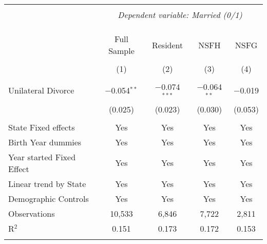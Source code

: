 
\begingroup 
\footnotesize 
\begin{tabular}{@{\extracolsep{5pt}}lcccc} 
\\[-1.8ex]\hline 
\hline \\[-1.8ex] 
 & \multicolumn{4}{c}{\textit{Dependent variable: Married (0/1)}} \\ 
\cline{2-5} 
\\[-1.8ex] &  &  &  & \\[-4.8ex] \\ 
 & Full Sample & Resident & NSFH & NSFG \\ 
\\[-1.8ex] & (1) & (2) & (3) & (4)\\ 
\hline \\[-1.8ex] 
 Unilateral Divorce & $-$0.054$^{**}$ & $-$0.074$^{***}$ & $-$0.064$^{**}$ & $-$0.019 \\ 
  & (0.025) & (0.023) & (0.030) & (0.053) \\ 
 \hline \\[-1.8ex] 
State Fixed effects & Yes & Yes & Yes & Yes \\ 
Birth Year dummies & Yes & Yes & Yes & Yes \\ 
Year started Fixed Effect & Yes & Yes & Yes & Yes \\ 
Linear trend by State & Yes & Yes & Yes & Yes \\ 
Demographic Controls & Yes & Yes & Yes & Yes \\ 
Observations & 10,533 & 6,846 & 7,722 & 2,811 \\ 
R$^{2}$ & 0.151 & 0.173 & 0.172 & 0.153 \\ 
\hline 
\hline \\[-1.8ex] 
\end{tabular} 
\endgroup 
